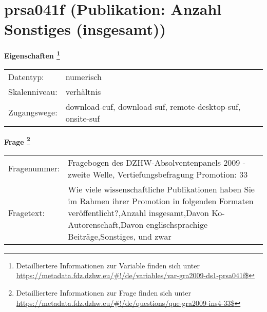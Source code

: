 
    \setcounter{footnote}{0}

    \vspace*{-1.8cm}
	\section{prsa041f (Publikation: Anzahl Sonstiges (insgesamt))}
	\label{section:prsa041f}



    \vspace*{0.5cm}
    \noindent\textbf{Eigenschaften
	\footnote{Detailliertere Informationen zur Variable finden sich unter
		\url{https://metadata.fdz.dzhw.eu/\#!/de/variables/var-gra2009-ds1-prsa041f$}}}\\
	\begin{tabularx}{\hsize}{@{}lX}
	Datentyp: & numerisch \\
	Skalenniveau: & verhältnis \\
	Zugangswege: &
	  download-cuf, 
	  download-suf, 
	  remote-desktop-suf, 
	  onsite-suf
 \\
    \end{tabularx}



				\vspace*{0.5cm}
                \noindent\textbf{Frage
	                \footnote{Detailliertere Informationen zur Frage finden sich unter
		              \url{https://metadata.fdz.dzhw.eu/\#!/de/questions/que-gra2009-ins4-33$}}}\\
				\begin{tabularx}{\hsize}{@{}lX}
					Fragenummer: &
					  Fragebogen des DZHW-Absolventenpanels 2009 - zweite Welle, Vertiefungsbefragung Promotion:
					  33
 \\
					Fragetext: & Wie viele wissenschaftliche Publikationen haben Sie im Rahmen ihrer Promotion in folgenden Formaten veröffentlicht?,Anzahl insgesamt,Davon Ko-Autorenschaft,Davon englischsprachige Beiträge,Sonstiges, und zwar \\
				\end{tabularx}





